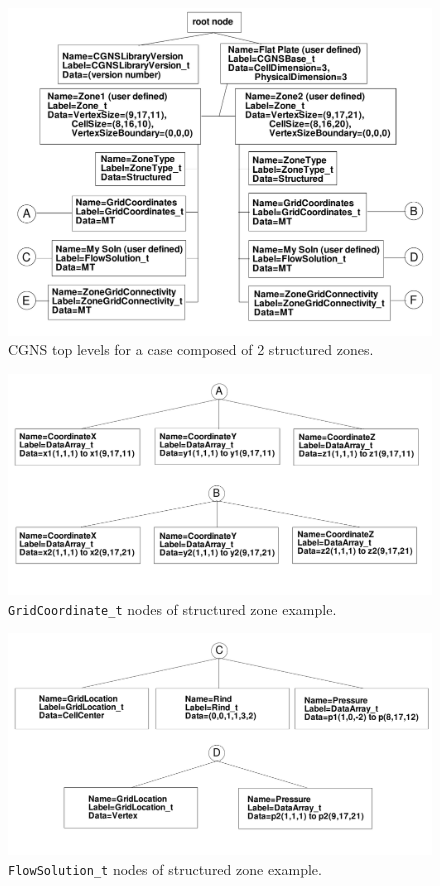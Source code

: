 \documentclass[12pt]{article}
\begin{document}
\begin{figure}[hpbt]
\centerline{{\includegraphics[width=150mm]{figures/str_exampleA}}}
\caption{CGNS top levels for a case composed of 2 structured zones.}
\label{FIGstr_exampleA}
\end{figure}
%
\begin{figure}[hpbt]
\centerline{{\includegraphics[width=150mm]{figures/str_exampleB}}}
\caption{{\tt GridCoordinate\_t} nodes of structured zone example.}
\label{FIGstr_exampleB}
\end{figure}
%
\begin{figure}[hpbt]
\centerline{{\includegraphics[width=150mm]{figures/str_exampleC}}}
\caption{{\tt FlowSolution\_t} nodes of structured zone example.}
\label{FIGstr_exampleC}
\end{figure}
\end{document}
